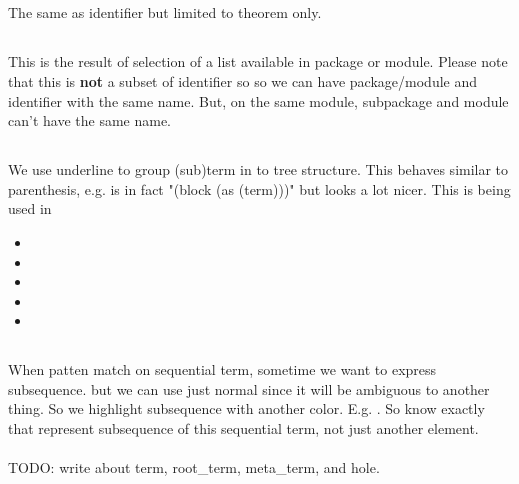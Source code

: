 \documentclass[master.tex]{subfiles}
\begin{document}
\subsection{} The same as identifier but limited to theorem only.

\subsection{} This is the result of selection of a list available in package or module. Please note that this is \textbf{not} a subset of identifier so so we can have package/module and identifier with the same name. But, on the same module, subpackage and module can't have the same name.

\subsection{} We use underline to group (sub)term in to tree structure. This behaves similar to parenthesis, e.g.  is in fact "(block (as (term)))" but looks a lot nicer. This is being used in
\begin{itemize}
    \item {}
    \item {}
    \item {}
    \item {}
    \item {}
\end{itemize}

\subsection{}
When patten match on sequential term, sometime we want to express subsequence. but we can use just normal  since it will be ambiguous to another thing. So we highlight subsequence with another color. E.g. . \psfmt{,} So know exactly that  represent subsequence of this sequential term, not just another element. \\ \\

TODO: write about term, root\_term, meta\_term, and hole.
\end{document}
